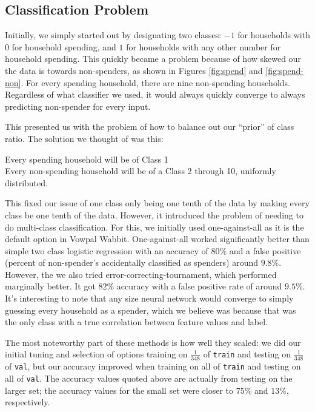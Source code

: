 \documentclass{article}
\begin{document}
\subsection*{Classification Problem}
Initially, we simply started out by designating two classes: $-1$ for households with $0$ for household spending, and $1$ for households with any other number for household spending. This quickly became a problem because of how skewed our the data is towards non-spenders, as shown in Figures \ref{fig:spend} and \ref{fig:spend-non}. For every spending household, there are nine non-spending households. Regardless of what classifier we used, it would always quickly converge to always predicting non-spender for every input.  

This presented us with the problem of how to balance out our ``prior'' of class ratio. The  solution we thought of was this:
\begin{center}
\vspace{-2mm}
Every spending household will be of Class 1 \\
\vspace{1mm}
Every non-spending household will be of a Class 2 through 10, uniformly distributed.
\vspace{-1mm}
\end{center}
This fixed our issue of one class only being one tenth of the data by making every class be one tenth of the data. However, it introduced the problem of needing to do multi-class classification. For this, we initially used one-against-all as it is the default option in Vowpal Wabbit. One-against-all worked significantly better than simple two class logistic regression with an accuracy of $80\%$ and a false positive (percent of non-spender's accidentally classified as spenders) around $9.8\%$. However, the we also tried error-correcting-tournament, which performed marginally better. \cite{beygelzimer_error-correcting_2009} It got $82\%$ accuracy with a false positive rate of around $9.5\%$. It's interesting to note that any size neural network would converge to simply guessing every household as a spender, which we believe was because that was the only class with a true correlation between feature values and label.

The most noteworthy part of these methods is how well they scaled: we did our initial tuning and selection of options training on $\frac{1}{348}$ of \texttt{train} and testing on $\frac{1}{348}$ of \texttt{val}, but our accuracy improved when training on all of \texttt{train} and testing on all of \texttt{val}. The accuracy values quoted above are actually from testing on the larger set; the accuracy values for the small set were closer to $75\%$ and $13\%$, respectively. 
\end{document}
